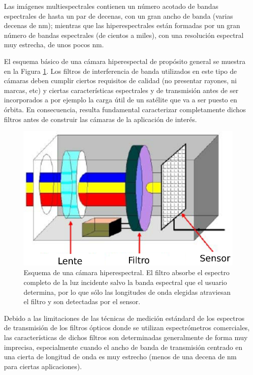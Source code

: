 \documentclass{ctuthesis}
\begin{document}
Las imágenes multiespectrales contienen un número acotado de bandas espectrales 
de hasta un par de decenas, con un gran ancho de banda (varias decenas de nm); 
mientras que las hiperespectrales están formadas por un gran número de bandas 
espectrales (de cientos a miles), con una resolución espectral muy estrecha, de 
unos pocos nm.

El esquema básico de una cámara hiperespectal de propósito general se muestra 
en la Figura \ref{fig:camsens}. Los filtros de interferencia de banda 
utilizados en este tipo de cámaras deben cumplir ciertos requisitos de calidad 
(no presentar rayones, ni marcas, etc) 
y ciertas características espectrales y de transmisión antes de ser 
incorporados a por ejemplo la carga útil de un satélite que va a ser puesto en 
órbita. En consecuencia, resulta fundamental caracterizar completamente dichos 
filtros antes de construir las cámaras de la aplicación de interés.

\begin{figure}[H]
	\centering
	\includegraphics[scale=0.8]{Figs/plan_de_tesis/cam_sens.png}
	\caption{ Esquema de una cámara hiperespectral. El filtro absorbe el 
	espectro completo de la luz incidente salvo la banda espectral que el 
	usuario determina, por lo que sólo las longitudes de onda elegidas 
	atraviesan el filtro y son detectadas por el sensor. \cite{Martínez2016}}
	\label{fig:camsens}
\end{figure}



Debido a las limitaciones de las técnicas de 
medición estándard 
de los espectros de transmisión de los filtros ópticos donde se utilizan 
espectrómetros comerciales, las características de dichos 
filtros son determinadas generalmente de forma muy imprecisa, especialmente 
cuando el ancho de banda de transmisión centrado en una cierta de longitud de 
onda es muy estrecho (menos de una decena de nm para ciertas aplicaciones).
\end{document}
